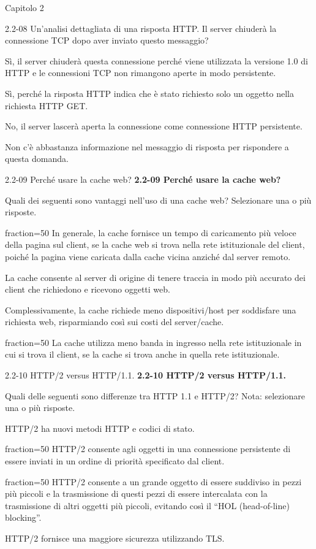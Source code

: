 \documentclass[11pt]{article}
\begin{document}
\begin{quiz}{Capitolo 2}
\begin{multi}[points=1,shuffle]{2.2-08 Un'analisi dettagliata di una risposta HTTP.}
Il server chiuderà la connessione TCP dopo aver inviato questo messaggio?
\item* Sì, il server chiuderà questa connessione perché viene utilizzata la versione 1.0 di HTTP e le connessioni TCP non rimangono aperte in modo persistente.
\item Sì, perché la risposta HTTP indica che è stato richiesto solo un oggetto nella richiesta HTTP GET.
\item No, il server lascerà aperta la connessione come connessione HTTP persistente.
\item Non c'è abbastanza informazione nel messaggio di risposta per rispondere a questa domanda.
\end{multi}
            
\begin{multi}[points=1,shuffle,multiple]{2.2-09 Perché usare la cache web?}
\textbf{2.2-09 Perché usare la cache web?}

Quali dei seguenti sono vantaggi nell'uso di una cache web? Selezionare una o più risposte.

\item[fraction=50] In generale, la cache fornisce un tempo di caricamento più veloce della pagina sul client, se la cache web si trova nella rete istituzionale del client, poiché la pagina viene caricata dalla cache vicina anziché dal server remoto.
\item La cache consente al server di origine di tenere traccia in modo più accurato dei client che richiedono e ricevono oggetti web.
\item Complessivamente, la cache richiede meno dispositivi/host per soddisfare una richiesta web, risparmiando così sui costi del server/cache.
\item[fraction=50] La cache utilizza meno banda in ingresso nella rete istituzionale in cui si trova il client, se la cache si trova anche in quella rete istituzionale.
\end{multi}
    

\begin{multi}[points=1,shuffle,multiple]{2.2-10 HTTP/2 versus HTTP/1.1.}
\textbf{2.2-10 HTTP/2 versus HTTP/1.1.}

Quali delle seguenti sono differenze tra HTTP 1.1 e HTTP/2? Nota: selezionare una o più risposte.

\item HTTP/2 ha nuovi metodi HTTP e codici di stato.
\item[fraction=50] HTTP/2 consente agli oggetti in una connessione persistente di essere inviati in un ordine di priorità specificato dal client.
\item[fraction=50] HTTP/2 consente a un grande oggetto di essere suddiviso in pezzi più piccoli e la trasmissione di questi pezzi di essere intercalata con la trasmissione di altri oggetti più piccoli, evitando così il ``HOL (head-of-line) blocking''.
\item HTTP/2 fornisce una maggiore sicurezza utilizzando TLS.
\end{multi}
    

\end{quiz}
\end{document}
